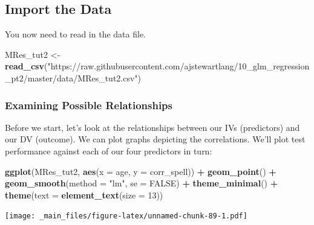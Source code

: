 \documentclass[
]{book}
\newenvironment{Shaded}{\begin{snugshade}}{\end{snugshade}}
\newcommand{\AttributeTok}[1]{\textcolor[rgb]{0.13,0.29,0.53}{#1}}
\newcommand{\ConstantTok}[1]{\textcolor[rgb]{0.56,0.35,0.01}{#1}}
\newcommand{\DecValTok}[1]{\textcolor[rgb]{0.00,0.00,0.81}{#1}}
\newcommand{\FunctionTok}[1]{\textcolor[rgb]{0.13,0.29,0.53}{\textbf{#1}}}
\newcommand{\NormalTok}[1]{#1}
\newcommand{\OtherTok}[1]{\textcolor[rgb]{0.56,0.35,0.01}{#1}}
\newcommand{\SpecialCharTok}[1]{\textcolor[rgb]{0.81,0.36,0.00}{\textbf{#1}}}
\newcommand{\StringTok}[1]{\textcolor[rgb]{0.31,0.60,0.02}{#1}}
\begin{document}
\hypertarget{import-the-data-1}{%
\subsection{Import the Data}\label{import-the-data-1}}

You now need to read in the data file.

\begin{Shaded}
\begin{Highlighting}[]
\NormalTok{MRes\_tut2 }\OtherTok{\textless{}{-}} \FunctionTok{read\_csv}\NormalTok{(}\StringTok{"https://raw.githubusercontent.com/ajstewartlang/10\_glm\_regression\_pt2/master/data/MRes\_tut2.csv"}\NormalTok{)}
\end{Highlighting}
\end{Shaded}

\hypertarget{examining-possible-relationships}{%
\subsubsection*{Examining Possible Relationships}\label{examining-possible-relationships}}

Before we start, let's look at the relationships between our IVs (predictors) and our DV (outcome). We can plot graphs depicting the correlations. We'll plot test performance against each of our four predictors in turn:

\begin{Shaded}
\begin{Highlighting}[]
\FunctionTok{ggplot}\NormalTok{(MRes\_tut2, }\FunctionTok{aes}\NormalTok{(}\AttributeTok{x =}\NormalTok{ age, }\AttributeTok{y =}\NormalTok{ corr\_spell)) }\SpecialCharTok{+} 
  \FunctionTok{geom\_point}\NormalTok{() }\SpecialCharTok{+} 
  \FunctionTok{geom\_smooth}\NormalTok{(}\AttributeTok{method =} \StringTok{"lm"}\NormalTok{, }\AttributeTok{se =} \ConstantTok{FALSE}\NormalTok{) }\SpecialCharTok{+}
  \FunctionTok{theme\_minimal}\NormalTok{() }\SpecialCharTok{+}
  \FunctionTok{theme}\NormalTok{(}\AttributeTok{text =} \FunctionTok{element\_text}\NormalTok{(}\AttributeTok{size =} \DecValTok{13}\NormalTok{)) }
\end{Highlighting}
\end{Shaded}

\texttt{[image: \_main\_files/figure-latex/unnamed-chunk-89-1.pdf]}
\end{document}
